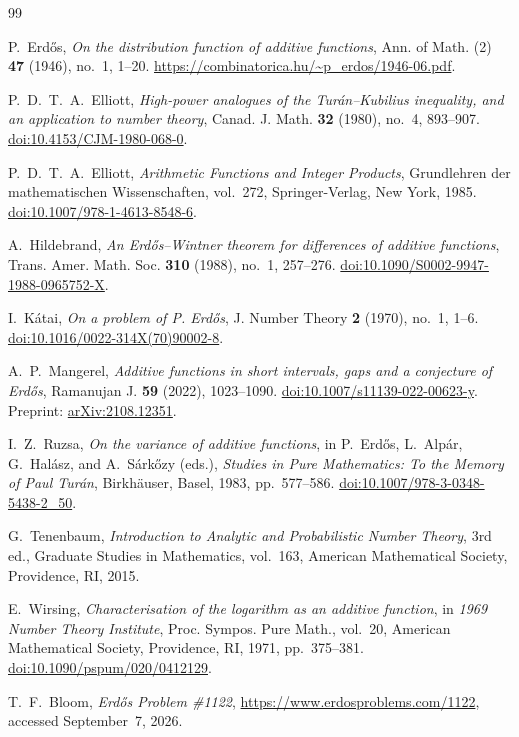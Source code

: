 \documentclass[11pt]{article}
\numberwithin{equation}{section}
\begin{document}
\begin{thebibliography}{99}

P.~Erd\H{o}s,
\emph{On the distribution function of additive functions},
Ann. of Math. (2) \textbf{47} (1946), no.~1, 1--20.
\url{https://combinatorica.hu/~p_erdos/1946-06.pdf}.

P.~D.~T.~A.~Elliott,
\emph{High-power analogues of the Tur\'an--Kubilius inequality, and an application to number theory},
Canad. J. Math. \textbf{32} (1980), no.~4, 893--907.
\href{https://doi.org/10.4153/CJM-1980-068-0}{doi:10.4153/CJM-1980-068-0}.

P.~D.~T.~A.~Elliott,
\emph{Arithmetic Functions and Integer Products},
Grundlehren der mathematischen Wissenschaften, vol.~272,
Springer-Verlag, New York, 1985.
\href{https://doi.org/10.1007/978-1-4613-8548-6}{doi:10.1007/978-1-4613-8548-6}.

A.~Hildebrand,
\emph{An Erd\H{o}s--Wintner theorem for differences of additive functions},
Trans. Amer. Math. Soc. \textbf{310} (1988), no.~1, 257--276.
\href{https://doi.org/10.1090/S0002-9947-1988-0965752-X}{doi:10.1090/S0002-9947-1988-0965752-X}.

I.~K\'atai,
\emph{On a problem of P. Erd\H{o}s},
J. Number Theory \textbf{2} (1970), no.~1, 1--6.
\href{https://doi.org/10.1016/0022-314X(70)90002-8}{doi:10.1016/0022-314X(70)90002-8}.

A.~P.~Mangerel,
\emph{Additive functions in short intervals, gaps and a conjecture of Erd\H{o}s},
Ramanujan J. \textbf{59} (2022), 1023--1090.
\href{https://doi.org/10.1007/s11139-022-00623-y}{doi:10.1007/s11139-022-00623-y}.
Preprint: \href{https://arxiv.org/abs/2108.12351}{arXiv:2108.12351}.

I.~Z.~Ruzsa,
\emph{On the variance of additive functions},
in P.~Erd\H{o}s, L.~Alp\'ar, G.~Hal\'asz, and A.~S\'ark\H{o}zy (eds.),
\emph{Studies in Pure Mathematics: To the Memory of Paul Tur\'an},
Birkh\"auser, Basel, 1983, pp.~577--586.
\href{https://doi.org/10.1007/978-3-0348-5438-2_50}{doi:10.1007/978-3-0348-5438-2\_50}.

G.~Tenenbaum,
\emph{Introduction to Analytic and Probabilistic Number Theory},
3rd ed., Graduate Studies in Mathematics, vol.~163,
American Mathematical Society, Providence, RI, 2015.

E.~Wirsing,
\emph{Characterisation of the logarithm as an additive function},
in \emph{1969 Number Theory Institute},
Proc. Sympos. Pure Math., vol.~20,
American Mathematical Society, Providence, RI, 1971, pp.~375--381.
\href{https://doi.org/10.1090/pspum/020/0412129}{doi:10.1090/pspum/020/0412129}.

T.~F.~Bloom,
\emph{Erd\H{o}s Problem \#1122},
\url{https://www.erdosproblems.com/1122}, accessed September~7, 2026.

\end{thebibliography}
\end{document}
